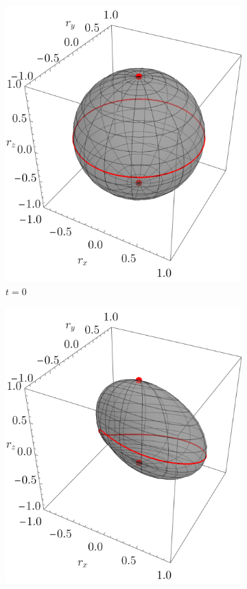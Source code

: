     \begin{figure}[ht!]
      \centering
      \begin{subfigure}{0.32\textwidth}
        \centering
        \includegraphics[width=0.9\linewidth]{chapter4/figures_toy/CNOT_p=0.5_t=0._r=0.9.png}
        \caption{$t=0$}
      \end{subfigure}%
      \begin{subfigure}{0.32\textwidth}
        \centering
        \includegraphics[width=0.9\linewidth]{chapter4/figures_toy/CNOT_p=0.5_t=0.5_r=0.9.png}

\end{subfigure}
\end{figure}
